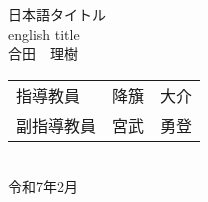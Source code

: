 \documentclass[a4paper]{ltjsreport}
\begin{document}
\begin{titlepage}
\Large
\begin{center}
\vspace*{80pt}
    {\huge 日本語タイトル} \\
\vspace*{10mm}
    {\huge english title}
\vspace*{80mm} \\
合田　理樹

\vspace*{10mm}
\begin{tabular}{ll}
    指導教員 & 降籏　大介 \\
    副指導教員 & 宮武　勇登 \\
\end{tabular}
\vspace*{20mm} \\
令和7年2月 \\
\end{center}
\end{titlepage}

\tableofcontents

















\appendix



\end{document}
